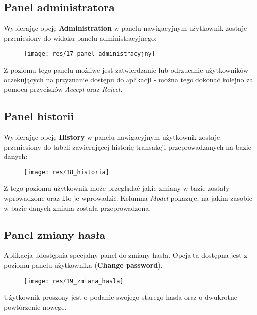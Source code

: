 \documentclass[12pt] {article}
\begin{document}
\subsection{Panel administratora}
Wybierając opcję \textbf{Administration} w panelu nawigacyjnym użytkownik zostaje przeniesiony do widoku panelu administracyjnego:
\begin{figure}[H]
\centering
\texttt{[image: res/17\_panel\_administracyjny]}
\end{figure}
Z poziomu tego panelu możliwe jest zatwierdzanie lub odrzucanie użytkowników oczekujących na przyznanie dostępu do aplikacji - można tego dokonać kolejno za pomocą przycisków \emph{Accept} oraz \emph{Reject}.

\subsection{Panel historii}
Wybierając opcję \textbf{History} w panelu nawigacyjnym użytkownik zostaje przeniesiony do tabeli zawierającej historię transakcji przeprowadzanych na bazie danych:
\begin{figure}[H]
\centering
\texttt{[image: res/18\_historia]}
\end{figure}
Z tego poziomu użytkownik może przeglądać jakie zmiany w bazie zostały wprowadzone oraz kto je wprowadził. Kolumna \emph{Model} pokazuje, na jakim zasobie w bazie danych zmiana została przeprowadzona. 


\subsection{Panel zmiany hasła}
Aplikacja udostępnia specjalny panel do zmiany hasła. Opcja ta dostępna jest z poziomu panelu użytkownika (\textbf{Change password}).
\begin{figure}[H]
\centering
\texttt{[image: res/19\_zmiana\_hasla]}
\end{figure}
Użytkownik proszony jest o podanie swojego starego hasła oraz o dwukrotne powtórzenie nowego.
\end{document}
